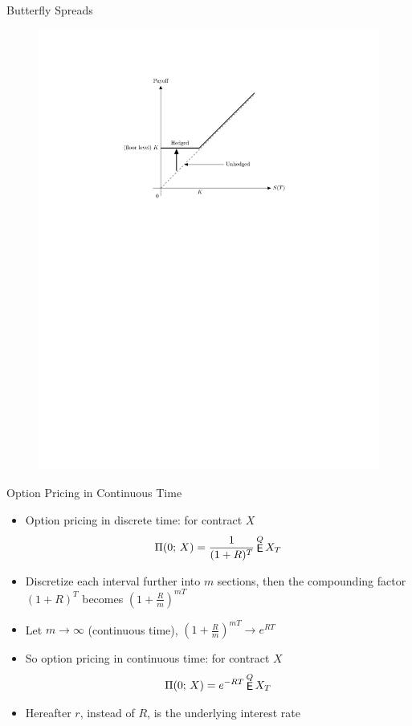 \documentclass[10pt,handout]{beamer}
\DeclareMathOperator\expc{{\sf E}}
\theoremstyle{definition}
\begin{document}
\begin{frame}{Butterfly Spreads}
\begin{figure}[!htbp]
    \includegraphics[scale=0.58,page=17]{fig/note08/lo.pdf}
  \end{figure}
\end{frame}

\begin{frame}{Option Pricing in Continuous Time}
  \begin{itemize}
    \item Option pricing in discrete time: for contract $X$ 
      \begin{align*}
        \Pi(0;\,X) = \frac{1}{(1 + R)^T}\expc^Q{X_T}
      \end{align*}
    \item Discretize each interval further into $m$ sections, then the compounding factor $(1 + R)^T$ becomes $(1 + \frac{R}m)^{mT}$
    \item Let $m\to\infty$ (continuous time), $(1 + \frac{R}m)^{mT}\to e^{RT}$
    \item So option pricing in continuous time: for contract $X$ 
      \begin{align*}
        \Pi(0;\,X) = e^{-RT}\expc^Q{X_T}
      \end{align*}
    \item Hereafter $r$, instead of $R$, is the underlying interest rate 
  \end{itemize}
\end{frame}
\end{document}
